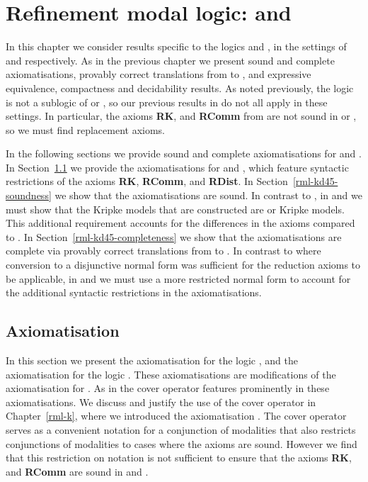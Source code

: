 \chapter{Refinement modal logic: \classKFF{} and \classKD{}}\label{rml-kd45}

In this chapter we consider results specific to the logics \logicRmlKFF{} and \logicRmlKD{}, in the settings of \classKFF{} and \classKD{} respectively.
As in the previous chapter we present sound and complete axiomatisations, provably correct translations from \langRml{} to \langMl{}, and expressive equivalence, compactness and decidability results.
As noted previously, the logic \logicRmlK{} is not a sublogic of \logicRmlKFF{} or \logicRmlKD{}, so our previous results in \logicRmlK{} do not all apply in these settings.
In particular, the axioms {\bf RK}, and {\bf RComm} from \axiomRmlK{} are not sound in \logicRmlKFF{} or \logicRmlKD{}, so we must find replacement axioms.

In the following sections we provide sound and complete axiomatisations for \logicRmlKFF{} and \logicRmlKD{}.
In Section~\ref{rml-kd45-axiomatisation} we provide the axiomatisations for \logicRmlKFF{} and \logicRmlKD{}, which feature syntactic restrictions of the axioms {\bf RK}, {\bf RComm}, and {\bf RDist}.
In Section~\ref{rml-kd45-soundness} we show that the axiomatisations are sound.
In contrast to \logicRmlK{}, in \logicRmlKFF{} and \logicRmlKD{} we must show that the Kripke models that are constructed are \classKFF{} or \classKD{} Kripke models.
This additional requirement accounts for the differences in the axioms compared to \logicRmlK{}.
In Section~\ref{rml-kd45-completeness} we show that the axiomatisations are complete via provably correct translations from \langRml{} to \langMl{}.
In contrast to \logicRmlK{} where conversion to a disjunctive normal form was sufficient for the reduction axioms to be applicable, in \logicRmlKFF{} and \logicRmlKD{} we must use a more restricted normal form to account for the additional syntactic restrictions in the axiomatisations.

\section{Axiomatisation}\label{rml-kd45-axiomatisation}

In this section we present the axiomatisation \axiomRmlKFF{} for the logic \logicRmlKFF{}, and the axiomatisation \axiomRmlKD{} for the logic \logicRmlKD{}.
These axiomatisations are modifications of the axiomatisation \axiomRmlK{} for \logicRmlK{}.
As in \axiomRmlK{} the cover operator features prominently in these axiomatisations.
We discuss and justify the use of the cover operator in Chapter~\ref{rml-k}, where we introduced the axiomatisation \axiomRmlK{}.
The cover operator serves as a convenient notation for a conjunction of modalities that also restricts conjunctions of modalities to cases where the axioms are sound.
However we find that this restriction on notation is not sufficient to ensure that the axioms {\bf RK}, and {\bf RComm} are sound in \logicRmlKFF{} and \logicRmlKD{}.

